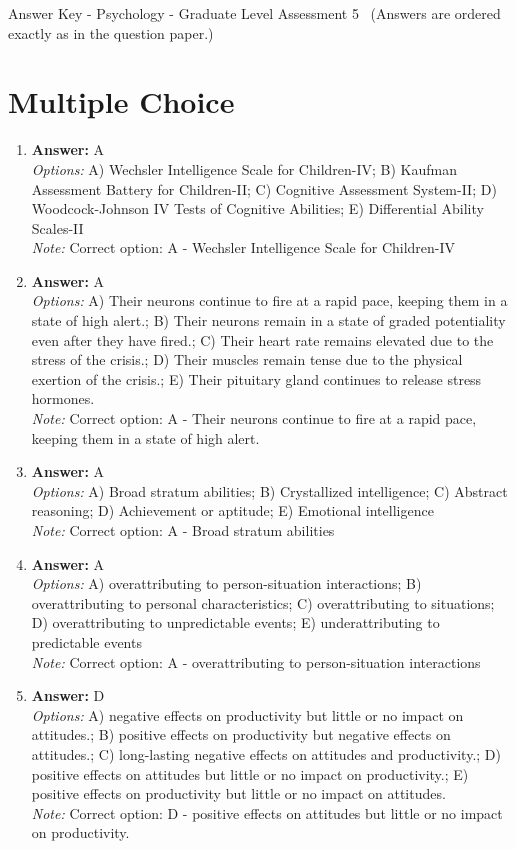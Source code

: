 \documentclass[12pt]{article}
\begin{document}
\begin{center}
Answer Key - Psychology - Graduate Level Assessment 5 \
\small (Answers are ordered exactly as in the question paper.)
\end{center}

\section*{Multiple Choice}
\begin{enumerate}[label=\arabic*.]
\item \textbf{Answer:} A
\\ \textit{Options:} A) Wechsler Intelligence Scale for Children-IV; B) Kaufman Assessment Battery for Children-II; C) Cognitive Assessment System-II; D) Woodcock-Johnson IV Tests of Cognitive Abilities; E) Differential Ability Scales-II
\\ \textit{Note:} Correct option: A - Wechsler Intelligence Scale for Children-IV
\item \textbf{Answer:} A
\\ \textit{Options:} A) Their neurons continue to fire at a rapid pace, keeping them in a state of high alert.; B) Their neurons remain in a state of graded potentiality even after they have fired.; C) Their heart rate remains elevated due to the stress of the crisis.; D) Their muscles remain tense due to the physical exertion of the crisis.; E) Their pituitary gland continues to release stress hormones.
\\ \textit{Note:} Correct option: A - Their neurons continue to fire at a rapid pace, keeping them in a state of high alert.
\item \textbf{Answer:} A
\\ \textit{Options:} A) Broad stratum abilities; B) Crystallized intelligence; C) Abstract reasoning; D) Achievement or aptitude; E) Emotional intelligence
\\ \textit{Note:} Correct option: A - Broad stratum abilities
\item \textbf{Answer:} A
\\ \textit{Options:} A) overattributing to person-situation interactions; B) overattributing to personal characteristics; C) overattributing to situations; D) overattributing to unpredictable events; E) underattributing to predictable events
\\ \textit{Note:} Correct option: A - overattributing to person-situation interactions
\item \textbf{Answer:} D
\\ \textit{Options:} A) negative effects on productivity but little or no impact on attitudes.; B) positive effects on productivity but negative effects on attitudes.; C) long-lasting negative effects on attitudes and productivity.; D) positive effects on attitudes but little or no impact on productivity.; E) positive effects on productivity but little or no impact on attitudes.
\\ \textit{Note:} Correct option: D - positive effects on attitudes but little or no impact on productivity.
\end{enumerate}
\end{document}
